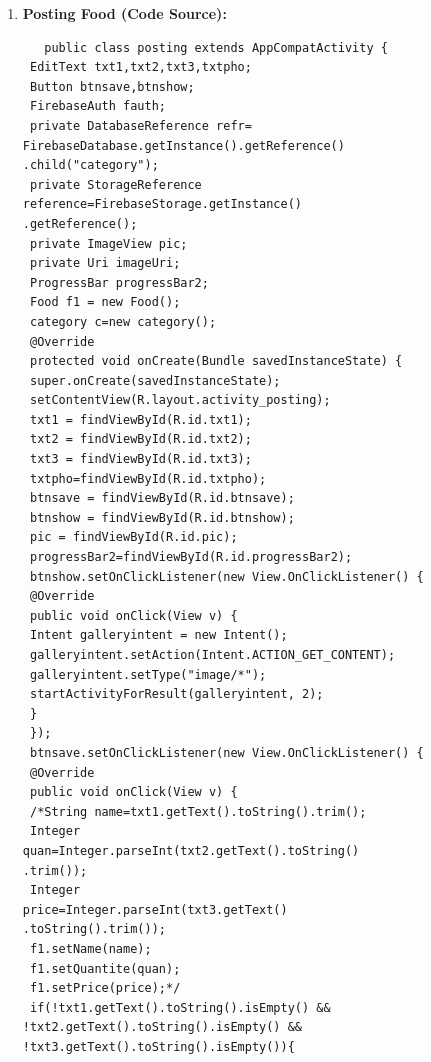 \begin{enumerate}
\begin{lstlisting}
fauth.createUserWithEmailAndPassword(email,pss)
.addOnCompleteListener(new
OnCompleteListener<AuthResult>() {
 @Override
 public void onComplete(@NonNull Task<AuthResult> task) {
 if(task.isSuccessful())
 {
 user u1=new
user(fullname,email,pss,mphone.getText().toString());

database.getReference().child("user")
.child(mphone.getText().toString()).
setValue(u1);
 Toast.makeText(signup.this,"user
created",Toast.LENGTH_SHORT).show();
 startActivity(new
Intent(getApplicationContext(),act2.class));
 }
 else
 {Toast.makeText(signup.this,"Erreur"
+task.getException().getMessage(),Toas
t.LENGTH_SHORT).show();
 progress1.setVisibility(View.GONE);
 }
 }});

 \end{lstlisting}
  
  
  \newpage
  \item \textbf{Posting Food  (Code Source):}
  \begin{lstlisting}
   public class posting extends AppCompatActivity {
 EditText txt1,txt2,txt3,txtpho;
 Button btnsave,btnshow;
 FirebaseAuth fauth;
 private DatabaseReference refr=
FirebaseDatabase.getInstance().getReference()
.child("category");
 private StorageReference
reference=FirebaseStorage.getInstance()
.getReference();
 private ImageView pic;
 private Uri imageUri;
 ProgressBar progressBar2;
 Food f1 = new Food();
 category c=new category();
 @Override
 protected void onCreate(Bundle savedInstanceState) {
 super.onCreate(savedInstanceState);
 setContentView(R.layout.activity_posting);
 txt1 = findViewById(R.id.txt1);
 txt2 = findViewById(R.id.txt2);
 txt3 = findViewById(R.id.txt3);
 txtpho=findViewById(R.id.txtpho);
 btnsave = findViewById(R.id.btnsave);
 btnshow = findViewById(R.id.btnshow);
 pic = findViewById(R.id.pic);
 progressBar2=findViewById(R.id.progressBar2);
 btnshow.setOnClickListener(new View.OnClickListener() {
 @Override
 public void onClick(View v) {
 Intent galleryintent = new Intent();
 galleryintent.setAction(Intent.ACTION_GET_CONTENT);
 galleryintent.setType("image/*");
 startActivityForResult(galleryintent, 2);
 }
 });
 btnsave.setOnClickListener(new View.OnClickListener() {
 @Override
 public void onClick(View v) {
 /*String name=txt1.getText().toString().trim();
 Integer
quan=Integer.parseInt(txt2.getText().toString()
.trim());
 Integer
price=Integer.parseInt(txt3.getText()
.toString().trim());
 f1.setName(name);
 f1.setQuantite(quan);
 f1.setPrice(price);*/
 if(!txt1.getText().toString().isEmpty() &&
!txt2.getText().toString().isEmpty() &&
!txt3.getText().toString().isEmpty()){

\end{lstlisting}
\end{enumerate}
